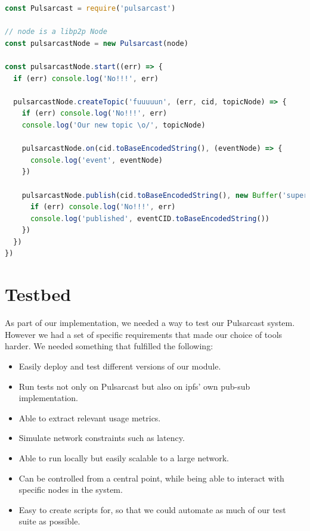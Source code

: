 \begin{lstlisting}[language=JavaScript, float=h, caption={Usage example of our Pulsarcast module},label={pulsarcast-usage-example}]
const Pulsarcast = require('pulsarcast')

// node is a libp2p Node
const pulsarcastNode = new Pulsarcast(node)

const pulsarcastNode.start((err) => {
  if (err) console.log('No!!!', err)
  
  pulsarcastNode.createTopic('fuuuuun', (err, cid, topicNode) => {
    if (err) console.log('No!!!', err)
    console.log('Our new topic \o/', topicNode)
    
    pulsarcastNode.on(cid.toBaseEncodedString(), (eventNode) => {
      console.log('event', eventNode)
    })
    
    pulsarcastNode.publish(cid.toBaseEncodedString(), new Buffer('super fun!'), (err, eventCID) => {
      if (err) console.log('No!!!', err)
      console.log('published', eventCID.toBaseEncodedString())
    })
  })
})
\end{lstlisting}

\section{Testbed}\label{sec:testbed}

As part of our implementation, we needed a way to test our Pulsarcast system.
However we had a set of specific requirements that made our choice of tools
harder. We needed something that fulfilled the following:

\begin{itemize}
  \item Easily deploy and test different versions of our module.
  \item Run tests not only on Pulsarcast but also on \acrshort{ipfs}' own pub-sub
    implementation.
  \item Able to extract relevant usage metrics.
  \item Simulate network constraints such as latency.
  \item Able to run locally but easily scalable to a large network.
  \item Can be controlled from a central point, while being able to interact
    with specific nodes in the system.
  \item Easy to create scripts for, so that we could automate as much of our
    test suite as possible.
\end{itemize}

